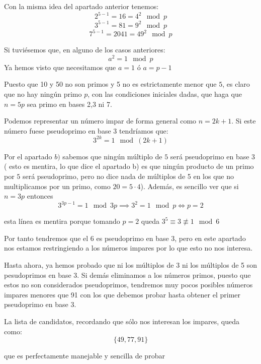 \begin{problem}[9]
Con la misma idea del apartado anterior tenemos:
\[2^{5-1} = 16=4^2 \mod p\]
\[3^{5-1} = 81=9^2 \mod p\]
\[7^{5-1} = 2041=49^2 \mod p\]

Si tuviésemos que, en alguno de los casos anteriores:
\[a^2 =1 \mod p\]
Ya hemos visto que necesitamos que $a=1$ ó $a=p-1$

Puesto que 10 y 50 no son primos y 5 no es estrictamente menor que $5$, es claro que no hay ningún primo $p$, con las condiciones iniciales dadas, que haga que $n=5p$ sea primo en bases 2,3 ni 7.


Podemos representar un número impar de forma general como $n=2k+1$. Si este número fuese pseudoprimo en base 3 tendríamos que:
\[3^{2k} = 1 \mod (2k+1)\]

Por el apartado $b)$ sabemos que ningún múltiplo de $5$ será pseudoprimo en base $3$ ({\color{red} esto es mentira, lo que dice el apartado b) es que ningún producto de un primo por $5$ será pseudoprimo, pero no dice nada de múltiplos de 5 en los que no multiplicamos por un primo, como $20=5·4$}). Además, es sencillo ver que si $n=3p$ entonces
\[3^{3p-1}=1 \mod 3p \implies 3^2 =1 \mod p \iff p=2\]

{\color{red} esta línea es mentira porque tomando $p=2$ queda $3^5\equiv3\not\equiv1 \mod 6$}

Por tanto tendremos que el $6$ es pseudoprimo en base 3, pero en este apartado nos estamos restringiendo a los números impares por lo que esto no nos interesa.

Hasta ahora, ya hemos probado que ni los múltiplos de 3 ni los múltiplos de 5 son pesudoprimos en base 3. Si demás eliminamos a los números primos, puesto que estos no son considerados pseudoprimos, tendremos muy pocos posibles números impares menores que 91 con los que debemos probar hasta obtener el primer pseudoprimo en base 3.

La lista de candidatos, recordando que sólo nos interesan los impares, queda como:
\[\{49, 77, 91\}\]

que es perfectamente manejable y sencilla de probar
\end{problem}

